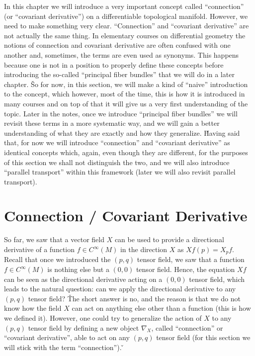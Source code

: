 In this chapter we will introduce a very important concept called ``connection'' (or ``covariant derivative'') on a
differentiable topological manifold. However, we need to make something very clear. ``Connection'' and ``covariant
derivative'' are not actually the same thing. In elementary courses on differential geometry the notions of
connection and covariant derivative are often confused with one another and, sometimes, the terms are even used as
synonyms. This happens because one is not in a position to properly define these concepts before introducing the
so-called ``principal fiber bundles'' that we will do in a later chapter. \v

So for now, in this section, we will make a kind of ``naive'' introduction to the concept, which however, most of the
time, this is how it is introduced in many courses and on top of that it will give us a very first understanding of
the topic. Later in the notes, once we introduce ``principal fiber bundles'' we will revisit these terms in a more
systematic way, and we will gain a better understanding of what they are exactly and how they generalize. \v

Having said that, for now we will introduce ``connection'' and ``covariant derivative'' as identical concepts which,
again, even though they are different, for the purposes of this section we shall not distinguish the two, and we will
also introduce ``parallel transport'' within this framework (later we will also revisit parallel transport).

\section{Connection / Covariant Derivative}

So far, we saw that a vector field $X$ can be used to provide a directional derivative of a function $f \in
C^{\infty}(M)$ in the direction $X$ as $Xf(p) = X_p f$. Recall that once we introduced the $(p,q)$ tensor field, we
saw that a function $f \in C^{\infty}(M)$ is nothing else but a $(0,0)$ tensor field. Hence, the equation $Xf$ can be
seen as the directional derivative acting on a $(0,0)$ tensor field, which leads to the natural question: can we
apply the directional derivative to any $(p,q)$ tensor field? \v

The short answer is no, and the reason is that we do not know how the field $X$ can act on anything else other than a
function (this is how we defined it). However, one could try to generalize the action of $X$ to any $(p,q)$ tensor
field by defining a new object $\nabla_X$, called ``connection'' or ``covariant derivative'', able to act on any $(p,
q) $ tensor field (for this section we will stick with the term ``connection''). \v

